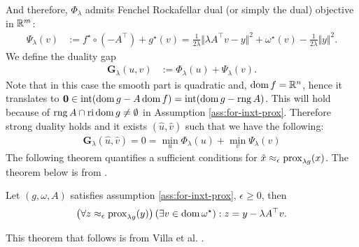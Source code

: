 \documentclass[12pt]{article}
\DeclareMathOperator{\rng}{\mathop{rng}}
\begin{document}
        And therefore, $\Phi_\lambda$ admits Fenchel Rockafellar dual (or simply the dual) objective in $\mathbb R^m$: 
        \begin{align}\label{eqn:dual-pp}
            \Psi_\lambda(v) &:= f^\star\circ(-A^\top) + g^\star(v) 
            = \frac{1}{2\lambda}\Vert \lambda A^\top v - y\Vert^2
            + \omega^\star(v) - \frac{1}{2\lambda}\Vert y\Vert^2. 
        \end{align}
        We define the duality gap
        \begin{align}\label{eqn:duality-gap-pp}
            \mathbf G_\lambda(u, v) &:= \Phi_\lambda(u) + \Psi_\lambda(v). 
        \end{align}
        Note that in this case the smooth part is quadratic and, $\operatorname{dom} f = \mathbb R^n$, hence it translates to ${\mathbf 0 \in \inte(\dom g - A \dom f) = \inte(\dom g - \rng A)}$. 
        This will hold because of $\rng A \cap \reli\dom g \neq\emptyset$ in Assumption \ref{ass:for-inxt-prox}.
        Therefore strong duality holds and it exists $(\hat u, \hat v)$ such that we have the following: 
        \begin{align*}
            \mathbf G_\lambda(\hat u, \hat v) = 0 = \min_{u} \Phi_\lambda(u) + \min_v \Psi_\lambda(v)
        \end{align*}
        The following theorem quantifies a sufficient conditions for $\tilde x \approx_\epsilon \operatorname{prox}_{\lambda g}(x)$. 
        The theorem below is from \cite[Proposition 2.2]{villa_accelerated_2013}. 
        \begin{theorem}\label{thm:primal-dual-trans}
            Let $(g, \omega, A)$ satisfies assumption \ref{ass:for-inxt-prox}, $\epsilon \ge 0$, then 
            \begin{align*}
                \left(
                    \forall z \approx_\epsilon \operatorname{prox}_{\lambda g}(y) 
                \right)(\exists v \in \operatorname{dom} \omega^\star): z = y - \lambda A^\top v. 
            \end{align*}
        \end{theorem}
        This theorem that follows is from Villa et al. \cite[Proposition 2.3]{villa_accelerated_2013}. 
\end{document}
